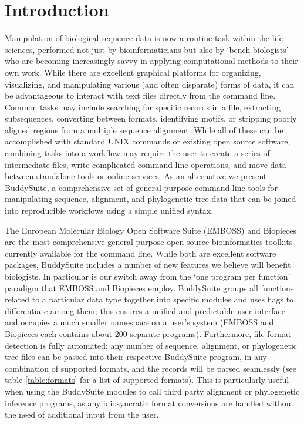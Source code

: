 \documentclass[nogrid]{MBE_article}%
\begin{document}
\section{{Introduction}\label{sec:Intro}}
Manipulation of biological sequence data is now a routine task within the life sciences, performed not just by bioinformaticians but also by `bench biologists' who are becoming increasingly savvy in applying computational methods to their own work. While there are excellent graphical platforms for organizing, visualizing, and manipulating various (and often disparate) forms of data, it can be advantageous to interact with text files directly from the command line. Common tasks may include searching for specific records in a file, extracting subsequences, converting between formats, identifying motifs, or stripping poorly aligned regions from a multiple sequence alignment. While all of these can be accomplished with standard UNIX commands or existing open source software, combining tasks into a workflow may require the user to create a series of intermediate files, write complicated command-line operations, and move data between standalone tools or online services. As an alternative we present BuddySuite, a comprehensive set of general-purpose command-line tools for manipulating sequence, alignment, and phylogenetic tree data that can be joined into reproducible workflows using a simple unified syntax.

The European Molecular Biology Open Software Suite (EMBOSS) \cite{Rice:2000wr} and Biopieces are the most comprehensive general-purpose open-source bioinformatics toolkits currently available for the command line. While both are excellent software packages, BuddySuite includes a number of new features we believe will benefit biologists. In particular is our switch away from the `one program per function' paradigm that EMBOSS and Biopieces employ. BuddySuite groups all functions related to a particular data type together into specific modules and uses flags to differentiate among them; this ensures a unified and predictable user interface and occupies a much smaller namespace on a user's system (EMBOSS and Biopieces each contains about 200 separate programs). Furthermore, file format detection is fully automated; any number of sequence, alignment, or phylogenetic tree files can be passed into their respective BuddySuite program, in any combination of supported formats, and the records will be parsed seamlessly (see table \ref{table:formats} for a list of supported formats). This is particularly useful when using the BuddySuite modules to call third party alignment or phylogenetic inference programs, as any idiosyncratic format conversions are handled without the need of additional input from the user.
\end{document}
